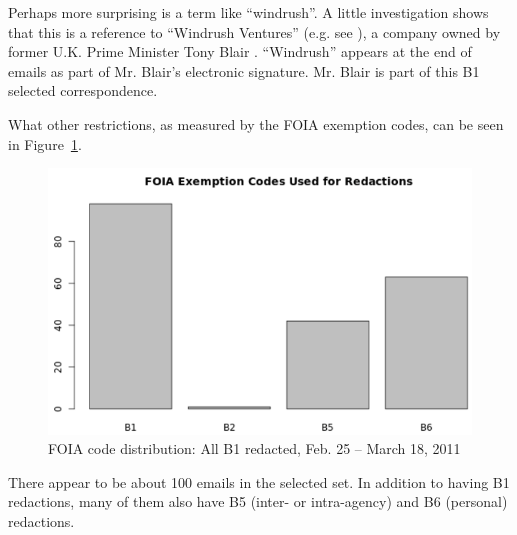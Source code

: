 \documentclass[journal]{vgtc}                %
\begin{document}
Perhaps more surprising is a term like ``windrush''.  A little investigation shows that this is a reference to ``Windrush Ventures'' (e.g. see  \cite{windrushTelegraph, windrushGuardian}),  a company owned by former U.K. Prime Minister Tony Blair .  ``Windrush'' appears at the end of emails as part of Mr. Blair's electronic signature.   Mr. Blair is part of this B1 selected correspondence.

What other restrictions, as measured by the FOIA exemption codes, can be seen in Figure~\ref{fig:FOIAB12011LibyaBuildup}.
\begin{figure}[h]
\begin{center}
\includegraphics[width=0.95\linewidth]{FOIAB12011LibyaBuildup}
\caption{FOIA code distribution: All  B1 redacted, Feb. 25 -- March 18, 2011}
\label{fig:FOIAB12011LibyaBuildup}
\end{center}
\end{figure}
There appear to be about 100 emails in the selected set.  In addition to having B1 redactions, many of them also have B5 (inter- or intra-agency) and B6 (personal) redactions.
\end{document}
